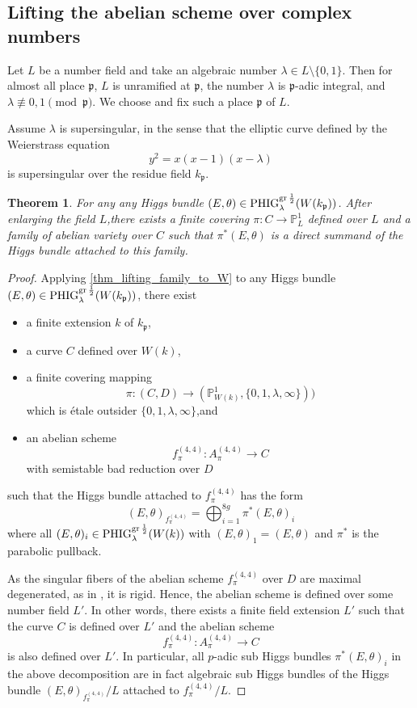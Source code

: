 \documentclass[12pt,twoside]{book}
\theoremstyle{plain}
\newtheorem{theorem}{Theorem}[section]
\theoremstyle{definition}
\theoremstyle{remark}
\newcommand{\frakp}{{\mathfrak p}}
\newcommand{\bP}{{\mathbb P}}
\numberwithin{equation}{section}
\def\PHigh{{\mathrm{PHIG}^{{\rm gr}\,{1\over 2}}_{\lambda}}}
\begin{document}
\subsection{Lifting the abelian scheme over complex numbers}

Let $L$ be a number field and take an algebraic number $\lambda \in L\setminus\{0,1\}$. Then for almost all place $\frakp$, $L$ is unramified at $\frakp$, the number $\lambda$ is $\frakp$-adic integral, and $\lambda\not\equiv 0,1 \pmod{\frakp}$.
We choose and fix such a place $\frakp$ of $L$.

Assume $\lambda$ is supersingular, in the sense that the elliptic curve defined by the Weierstrass equation \[y^2=x(x-1)(x-\lambda)\]
is supersingular over the residue field $k_\frakp$.

\begin{theorem} \label{thm_family_from_W_to_number_field}
For any any Higgs bundle $(E,\theta)\in \PHigh(W(k_\frakp))$. After enlarging the field $L$,there exists a finite covering $\pi\colon C\rightarrow \bP^1_L$ defined over $L$ and a family of abelian variety over $C$ such that $\pi^*(E,\theta)$ is a direct summand of the Higgs bundle attached to this family.
\end{theorem}

\begin{proof}
Applying \autoref{thm_lifting_family_to_W} to any Higgs bundle $(E,\theta)\in \PHigh(W(k_\frakp))$, there exist
\begin{itemize}
\item a finite extension $k$ of $k_\frakp$,
\item a curve $C$ defined over $W(k)$,
\item a finite covering mapping
\[\pi: (C,D)\to (\mathbb P^1_{W(k)},\{0,1,\lambda,\infty\}))\]
which is \'etale outsider $\{0,1,\lambda,\infty\}$,and
\item an abelian scheme
\[f^{(4,4)}_{\pi}: A^{(4,4)}_{\pi}\to C\]
with semistable bad reduction over $D$
\end{itemize}
such that the Higgs bundle attached to $f^{(4,4)}_{\pi}$ has the form
\[(E,\theta)_{f^{(4,4)}_{\pi}}=\bigoplus_{i=1}^{8g}\pi^*(E,\theta)_i\]
where all $(E,\theta)_i\in \PHigh(W(k))$ with $(E,\theta)_1=(E,\theta)$ and $\pi^*$ is the parabolic pullback.

As the singular fibers of the abelian scheme $f^{(4,4)}_{\pi}$ over $D$ are maximal degenerated, as in \cite[Section 4]{KYZ22}, it is rigid. Hence, the abelian scheme is defined over some number field $L'$. In other words, there exists a finite field extension $L'$ such that the curve $C$ is defined over $L'$ and the abelian scheme
\[f^{(4,4)}_{\pi}: A^{(4,4)}_{\pi}\to C\]
is also defined over $L'$. In particular, all $p$-adic sub Higgs bundles $\pi^*(E,\theta )_i$ in the above decomposition are in fact algebraic sub Higgs bundles of the Higgs bundle $(E,\theta)_{f^{(4,4)}_{\pi}}/L$ attached to $f^{(4,4)}_{\pi}/L$.
\end{proof}
\end{document}
